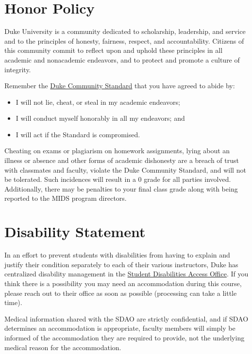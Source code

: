 \documentclass[12pt]{article}
\begin{document}
\section{Honor Policy}

Duke University is a community dedicated to scholarship, leadership, and service and to the principles of honesty, fairness, respect, and accountability. Citizens of this community commit to reflect upon and uphold these principles in all academic and nonacademic endeavors, and to protect and promote a culture of integrity.

Remember the \href{https://studentaffairs.duke.edu/conduct/about-us/duke-community-standard}{Duke Community Standard} that you have agreed to abide by:

\begin{itemize}
	\item I will not lie, cheat, or steal in my academic endeavors;
	\item I will conduct myself honorably in all my endeavors; and
	\item I will act if the Standard is compromised.
\end{itemize}

Cheating on exams or plagiarism on homework assignments, lying about an illness or absence and other forms of academic dishonesty are a breach of trust with classmates and faculty, violate the Duke Community Standard, and will not be tolerated. Such incidences will result in a 0 grade for all parties involved. Additionally, there may be penalties to your final class grade along with being reported to the MIDS program directors.

\section{Disability Statement}

In an effort to prevent students with disabilities from having to explain and justify their condition separately to each of their various instructors, Duke has centralized disability management in the \href{https://access.duke.edu/students}{Student Disabilities Access Office}. If you think there is a possibility you may need an accommodation during this course, please reach out to their office as soon as possible (processing can take a little time).

Medical information shared with the SDAO are strictly confidential, and if SDAO determines an accommodation is appropriate, faculty members will simply be informed of the accommodation they are required to provide, not the underlying medical reason for the accommodation.
\end{document}
